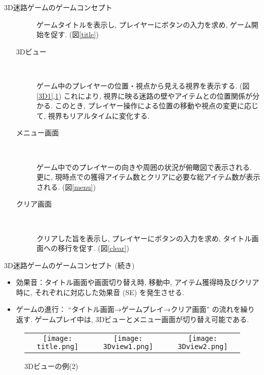 \documentclass[10pt]{jsarticle}
\begin{document}
\begin{itembox}[l]{3D迷路ゲームのゲームコンセプト}
\begin{itemize}
\begin{description}
			ゲームタイトルを表示し, プレイヤーにボタンの入力を求め, ゲーム開始を促す. (図\ref{title})
			\item[3Dビュー] 　\par
			ゲーム中のプレイヤーの位置・視点から見える視界を表示する. (図\ref{3D1},\ref{3D2})
			これにより, 視界に映る迷路の壁やアイテムとの位置関係が分かる.
			このとき, プレイヤー操作による位置の移動や視点の変更に応じて, 視界もリアルタイムに変化する.
			\item[メニュー画面] 　\par
			ゲーム中でのプレイヤーの向きや周囲の状況が俯瞰図で表示される.
			更に, 現時点での獲得アイテム数とクリアに必要な総アイテム数が表示される. (図\ref{menu})
			\item[クリア画面] 　\par
			クリアした旨を表示し, プレイヤーにボタンの入力を求め, タイトル画面への移行を促す. (図\ref{clear})
			\end{description}
\end{itemize}
\end{itembox}

\begin{itembox}[l]{3D迷路ゲームのゲームコンセプト (続き)}
\begin{itemize}
	\item	効果音：タイトル画面や画面切り替え時, 移動中, アイテム獲得時及びクリア時に, 
			それぞれに対応した効果音 (SE) を発生させる.
	\item	ゲームの進行： ``タイトル画面→ゲームプレイ→クリア画面'' の流れを繰り返す.
			ゲームプレイ中は, 3Dビューとメニュー画面が切り替え可能である.
\end{itemize}
\end{itembox}

\begin{figure}[h]
	\begin{tabular}{ccc}
	\begin{minipage}[t]{0.33\textwidth}
		\centering
		\texttt{[image: title.png]}
		\caption{タイトル画面}
 		\label{title}
	\end{minipage} &
	\begin{minipage}[t]{0.33\textwidth}
		\centering
		\texttt{[image: 3Dview1.png]}
		\caption{3Dビューの例(1)}
 		\label{3D1}
	\end{minipage} &
	\begin{minipage}[t]{0.33\textwidth}
		\centering
		\texttt{[image: 3Dview2.png]}
		\caption{3Dビューの例(2)}
 		\label{3D2}
	\end{minipage}
	\end{tabular}
\end{figure}
\end{document}
